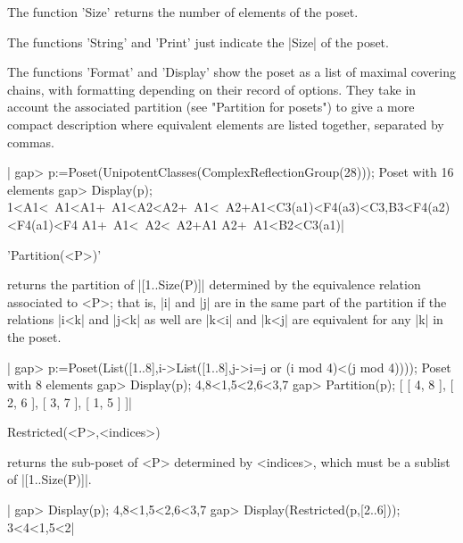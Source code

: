 %

The function 'Size' returns the number of elements of the poset.

The functions 'String' and 'Print' just indicate the |Size| of the poset.

The  functions 'Format' and 'Display'  show the poset as  a list of maximal
covering chains, with formatting depending on their record of options. They
take  in account the  associated partition (see  "Partition for posets") to
give  a  more  compact  description  where  equivalent  elements are listed
together, separated by commas.

|    gap> p:=Poset(UnipotentClasses(ComplexReflectionGroup(28)));
    Poset with 16 elements
    gap> Display(p); 
    1<A1<~A1<A1+~A1<A2<A2+~A1<~A2+A1<C3(a1)<F4(a3)<C3,B3<F4(a2)<F4(a1)<F4
    A1+~A1<~A2<~A2+A1
    A2+~A1<B2<C3(a1)|

%
%

'Partition(<P>)'

returns  the  partition  of  |[1..Size(P)]|  determined  by the equivalence
relation  associated to <P>; that  is, |i| and |j|  are in the same part of
the  partition if the relations |i<k| and |j<k| as well are |k<i| and |k<j|
are equivalent for any |k| in the poset.

|    gap> p:=Poset(List([1..8],i->List([1..8],j->i=j or (i mod 4)<(j mod 4))));
    Poset with 8 elements
    gap> Display(p);
    4,8<1,5<2,6<3,7
    gap> Partition(p);
    [ [ 4, 8 ], [ 2, 6 ], [ 3, 7 ], [ 1, 5 ] ]|

%

Restricted(<P>,<indices>)

returns the sub-poset of <P> determined by <indices>, which must be a sublist
of |[1..Size(P)]|.

|    gap> Display(p);
    4,8<1,5<2,6<3,7
    gap> Display(Restricted(p,[2..6]));
    3<4<1,5<2|

